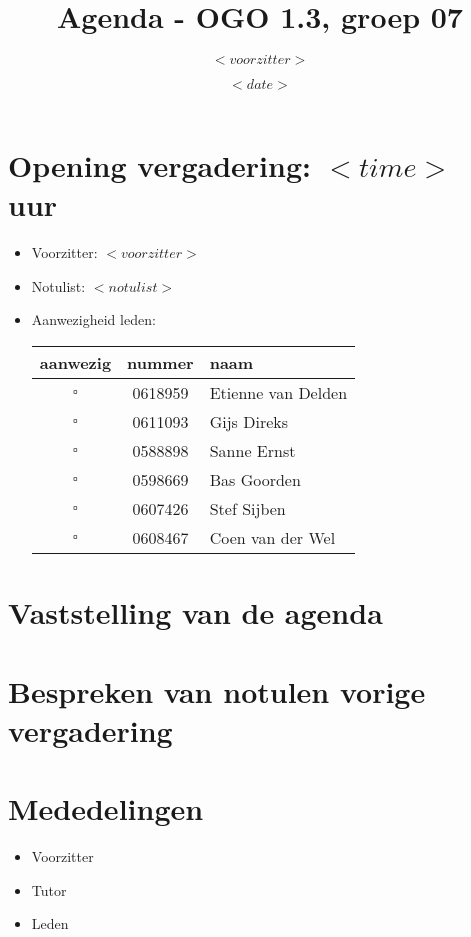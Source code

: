 \documentclass[]{article}
\title{Agenda - OGO 1.3, groep 07 }
\author{ $<voorzitter>$ }
\date{$<date>$}
\begin{document}
\maketitle


\section{Opening vergadering: $<time>$ uur }
  \begin{itemize}
    \item Voorzitter: $<voorzitter>$
    \item Notulist: $<notulist>$
    \item Aanwezigheid leden: 

    \begin{tabular}{c | c | l}
      aanwezig & nummer & naam \\
      \hline
      $\square$ & 0618959 & Etienne van Delden \\
      $\square$ & 0611093 & Gijs Direks \\
      $\square$ & 0588898 & Sanne Ernst \\
      $\square$ & 0598669 & Bas Goorden \\ 
      $\square$ & 0607426 & Stef Sijben\\
      $\square$ & 0608467 & Coen van der Wel \\

    \end{tabular}
    
  \end{itemize}

\section{Vaststelling van de agenda}

\section{Bespreken van notulen vorige vergadering}

 
 \section{Mededelingen}
 \begin{itemize}
   \item Voorzitter
   \item Tutor
   \item Leden
 \end{itemize}
\end{document}
